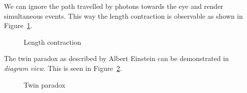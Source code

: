 \documentclass{egpubl}
\begin{document}
We can ignore the path travelled by photons towards the eye and render simultaneous events. This way the length contraction is observable as shown in Figure~\ref{fig:lengthContraction}.
\begin{figure}[htb]
\center
{}
\caption{Length contraction}
\label{fig:lengthContraction}
\end{figure}

The twin paradox as described by Albert Einstein can be demonstrated in \emph{diagram view}. This is seen in Figure~\ref{fig:twinParadox}.
\begin{figure}[htb]
\center
{}
\caption{Twin paradox}
\label{fig:twinParadox}
\end{figure}
\end{document}
